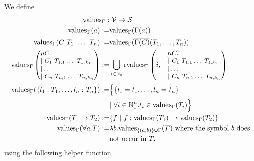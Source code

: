 \documentclass[]{scrbook}
\theoremstyle{definition}
\theoremstyle{definition}
\theoremstyle{definition}
\theoremstyle{remark}
\begin{document}
We define \[
\begin{aligned}
\mathrm{values}_\Gamma :& \ \mathcal{V} \to \mathcal{S}\\
\mathrm{values}_\Gamma(a) :=& \mathrm{values}_\Gamma(\Gamma(a))\\
\mathrm{values}_\Gamma(C \ T_1 \ \dots \ T_n) :=& \mathrm{values}_\Gamma(\overline{\Gamma(C)}(T_1,\dots,T_n))\\
\mathrm{values}_\Gamma\small\begin{pmatrix*}[l]
    \mu C.\\
    | \ C_1 \ T_{1,1} \dots \ T_{1,k_1}\\
    | \dots \\
    | \ C_n \ T_{n,1} \dots \ T_{n,k_n}
    \end{pmatrix*} :=&\bigcup_{i\in\mathbb{N}_0} \mathrm{rvalues}_\Gamma
  \begin{pmatrix*}[l]
  i,&
  \small\begin{matrix*}[l]
    \mu C.\\
    | \ C_1 \ T_{1,1} \dots \ T_{1,k_1}\\
    | \dots \\
    | \ C_n \ T_{n,1} \dots \ T_{n,k_n}
  \end{matrix*}
  \end{pmatrix*}\\
\small{\mathrm{values}_\Gamma(\{l_1:T_1,\dots,l_n:T_n\})} :=&\Big\{\small{\{l_1=t_1,\dots,l_n=t_n\}} \\
  &| \ \small{\forall i\in\mathbb{N}_1^n.t_i \in\mathrm{values}_\Gamma(T_i)}\Big\}\\
\mathrm{values}_\Gamma(T_1 \to T_2) :=&\{f \ | \ f:\mathrm{values}_\Gamma(T_1)\to\mathrm{values}_\Gamma(T_2)\}\\
\mathrm{values}_\Gamma(\forall a.T) :=& \lambda b.\mathrm{values}_{\{(a,b)\}\cup\Gamma}(T) \text{ where the symbol } b \text{ does}\\
  &\text{not occur in } T.
\end{aligned}
\] using the following helper function.
\end{document}
